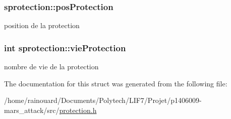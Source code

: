 \subsubsection[{\texorpdfstring{pos\+Protection}{posProtection}}]{ sprotection\+::pos\+Protection}\hypertarget{structsprotection_afc4666e7ac4608fecc09f1633f9d8760}{}\label{structsprotection_afc4666e7ac4608fecc09f1633f9d8760}
position de la protection 
\subsubsection[{\texorpdfstring{vie\+Protection}{vieProtection}}]{\setlength{\rightskip}{0pt plus 5cm}int sprotection\+::vie\+Protection}\hypertarget{structsprotection_a94ddbe90697e9f7e8b3bb4010998d7af}{}\label{structsprotection_a94ddbe90697e9f7e8b3bb4010998d7af}
nombre de vie de la protection 

The documentation for this struct was generated from the following file\+:\begin{DoxyCompactItemize}
\item 
/home/rainouard/\+Documents/\+Polytech/\+L\+I\+F7/\+Projet/p1406009-\/mars\+\_\+attack/src/\hyperlink{protection_8h}{protection.\+h}\end{DoxyCompactItemize}
